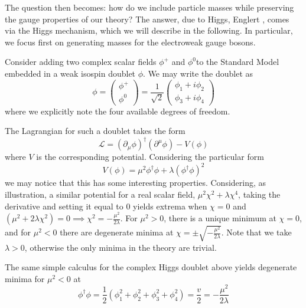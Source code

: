 The question then becomes: how do we include particle masses while preserving the gauge properties of our theory?
The answer, due to Higgs, Englert , comes via the Higgs mechanism, which we will describe in the following.
In particular, we focus first on generating masses for the electroweak gauge bosons. 

Consider adding two complex scalar fields $\phi^{+}$ and $\phi^{0}$to the Standard Model embedded in a 
weak isospin doublet $\phi$. We may write the doublet as
\begin{equation}
\phi = \begin{pmatrix}\phi^{+}\\\phi^{0}\end{pmatrix} = \frac{1}{\sqrt{2}}\begin{pmatrix}\phi_1+i\phi_2\\\phi_3+i\phi_4\end{pmatrix}
\end{equation}
where we explicitly note the four available degrees of freedom.

The Lagrangian for such a doublet takes the form
\begin{equation}
\mathcal{L} = (\partial_{\mu}\phi)^{\dagger}(\partial^{\mu}\phi) - V(\phi)
\end{equation}
where $V$ is the corresponding potential. Considering the particular form
\begin{equation}
V(\phi) = \mu^2\phi^{\dagger}\phi + \lambda(\phi^{\dagger}\phi)^2
\end{equation}
we may notice that this has some interesting properties. Considering, as illustration,
a similar potential for a real scalar field, $\mu^2\chi^2 +\lambda\chi^4$, taking the derivative
and setting it equal to 0 yields extrema when $\chi=0$ and $(\mu^2+2\lambda\chi^2) = 0 \implies \chi^2 = -\frac{\mu^2}{2\lambda}$.
For $\mu^2 > 0$, there is a unique minimum at $\chi=0$, and for $\mu^2 < 0$ there are 
degenerate minima at $\chi = \pm\sqrt{-\frac{\mu^2}{2\lambda}}$. Note that we take $\lambda > 0$, 
otherwise the only minima in the theory are trivial.

The same simple calculus for the complex Higgs doublet above yields degenerate minima for $\mu^2 < 0$ at
\begin{equation}
\phi^{\dagger}\phi = \frac{1}{2}(\phi_{1}^2+\phi_{2}^2+\phi_{3}^2+\phi_{4}^2) = \frac{v}{2}=-\frac{\mu^2}{2\lambda}
\end{equation}

